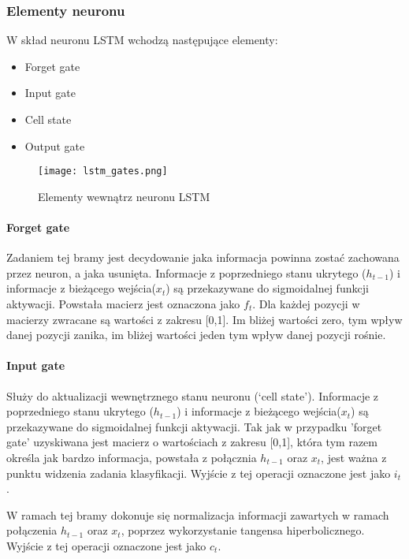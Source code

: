 \subsubsection{Elementy neuronu}

W skład neuronu LSTM wchodzą następujące elementy:
\begin{itemize}
    \item Forget gate
    \item Input gate
    \item Cell state
    \item Output gate
\end{itemize}

\begin{figure}[!h]
    \label{fig:lstm_gates}
    \centering \texttt{[image: lstm\_gates.png]}
    \caption{Elementy wewnątrz neuronu LSTM}
\end{figure}

\paragraph{Forget gate}  \hfill

Zadaniem tej bramy jest decydowanie jaka informacja powinna zostać zachowana przez neuron, a jaka usunięta. Informacje z poprzedniego stanu ukrytego ($h_{t-1}$) i informacje z bieżącego wejścia($x_t$) są przekazywane do sigmoidalnej funkcji aktywacji. Powstała macierz jest oznaczona jako $f_t$. Dla każdej pozycji w macierzy zwracane są wartości z zakresu [0,1]. Im bliżej wartości zero, tym wpływ danej pozycji zanika, im bliżej wartości jeden tym wpływ danej pozycji rośnie.


\paragraph{Input gate}  \hfill

Służy do aktualizacji wewnętrznego stanu neuronu (‘cell state’). Informacje z poprzedniego stanu ukrytego ($h_{t-1}$) i informacje z bieżącego wejścia($x_t$) są przekazywane do sigmoidalnej funkcji aktywacji. Tak jak w przypadku 'forget gate’ uzyskiwana jest macierz o wartościach z zakresu [0,1], która tym razem określa jak bardzo informacja, powstała z połącznia $h_{t-1}$ oraz $x_t$, jest ważna z punktu widzenia zadania klasyfikacji. Wyjście z tej operacji oznaczone jest jako $i_t$.

W ramach tej bramy dokonuje się normalizacja informacji zawartych w ramach połączenia $h_{t-1}$ oraz $x_t$, poprzez wykorzystanie tangensa hiperbolicznego. Wyjście z tej operacji oznaczone jest jako $c_t$.

